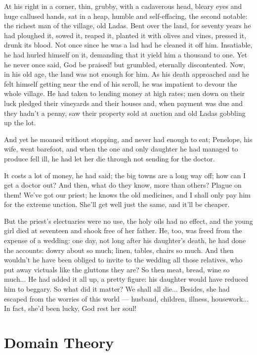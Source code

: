 \documentclass[diploma]{softlab-thesis}
\begin{document}
At his right in a corner, thin, grubby, with a cadaverous head, bleary eyes
and huge callused hands, sat in a heap, humble and self-effacing, the second
notable: the richest man of the village, old Ladas. Bent over the land, for
seventy years he had ploughed it, sowed it, reaped it, planted it with
olives and vines, pressed it, drunk its blood. Not once since he was a lad
had he cleaned it off him. Insatiable, he had hurled himself on it,
demanding that it yield him a thousand to one. Yet he never once said, God
be praised! but grumbled, eternally discontented. Now, in his old age, the
land was not enough for him. As his death approached and he felt himself
getting near the end of his scroll, he was impatient to devour the whole
village. He had taken to lending money at high rates; men down on their luck
pledged their vineyards and their houses and, when payment was due and they
hadn’t a penny, saw their property sold at auction and old Ladas gobbling up
the lot.

And yet he moaned without stopping, and never had enough to eat; Penelope,
his wife, went barefoot, and when the one and only daughter he had managed
to produce fell ill, he had let her die through not sending for the doctor.

It costs a lot of money, he had said; the big towns are a long way off; how
can I get a doctor out? And then, what do they know, more than others?
Plague on them! We’ve got our priest; he knows the old medicines, and I
shall only pay him for the extreme unction. She’ll get well just the same,
and it’ll be cheaper.

But the priest’s electuaries were no use, the holy oils had no effect, and
the young girl died at seventeen and shook free of her father. He, too, was
freed from the expense of a wedding: one day, not long after his daughter’s
death, he had done the accounts: dowry about so much; linen, tables, chairs
so much. And then wouldn’t he have been obliged to invite to the wedding all
those relatives, who put away victuals like the gluttons they are? So then
meat, bread, wine so much... He had added it all up, a pretty figure: his
daughter would have reduced him to beggary. So what did it matter? We shall
all die... Besides, she had escaped from the worries of this world ---
husband, children, illness, housework... In fact, she’d been lucky, God rest
her soul!


\section{Domain Theory}
\end{document}
